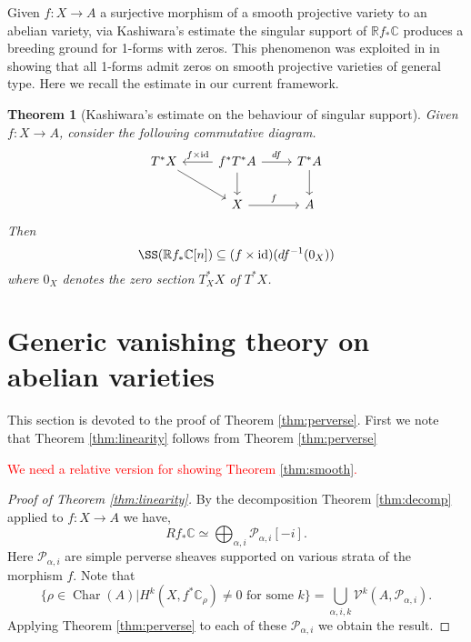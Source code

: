 \documentclass[12pt,reqno]{amsart}
\newtheorem{theorem}{Theorem}
\theoremstyle{question}
\theoremstyle{definition}
\theoremstyle{remark}
\theoremstyle{cited}
\theoremstyle{citeddef}
\DeclareMathOperator{\id}{id}                    %
\DeclareMathOperator{\Char}{Char}
\newcommand{\sP}{\mathcal{P}}
\newcommand\sV{{\mathcal V}}
\newcommand{\bbC}{\mathbb{C}}
\newcommand{\bbR}{\mathbb{R}}
\newcommand{\sorry}[1]{\textcolor{red}{#1}}
\begin{document}
Given $f\colon X\to A$ a surjective morphism of a smooth projective variety to an abelian
variety, via Kashiwara's estimate the singular support of $\bbR f_*\bbC$ produces a breeding ground for 1-forms with zeros. This phenomenon was exploited in
\cite{PS14}
in showing that all 1-forms admit zeros on smooth projective
varieties of general type. Here we recall the estimate in our
current framework. 
\begin{theorem}[Kashiwara's estimate on the behaviour of singular support]
Given $f\colon X\to A$, consider the following commutative diagram.
\[
\begin{tikzcd}
T^*X \ar[dr]& f^*T^*A \ar[d]\ar[r, "df"]\ar[l, "f\times\id"'] & T^*A\ar[d]\\
&X\ar[r, "f"] &A
\end{tikzcd}
\]
Then 
\[\SS(\bbR f_* \bbC[n]) \subseteq (f\times \id)(df^{-1}(0_X))\]
where $0_X$ denotes the zero section $T^*_XX$ of $T^*X$.

\label{thm:}
\end{theorem}












\section{Generic vanishing theory on abelian varieties}
This section is devoted to the proof of Theorem \ref{thm:perverse}. First we note that Theorem \ref{thm:linearity} follows
from Theorem \ref{thm:perverse}

\sorry{We need a relative version for showing Theorem \ref{thm:smooth}.}

\begin{proof}[Proof of Theorem \ref{thm:linearity}]
By the decomposition Theorem \ref{thm:decomp} applied to $f\colon X\to A$
we have, 
\[Rf_*\bbC\simeq \bigoplus_{\alpha,i} \sP_{\alpha,i}[-i].\]
Here $\sP_{\alpha, i}$ are simple perverse sheaves supported on various strata of the morphism $f$. 
Note that
\[\{\rho\in \Char(A)| H^k(X, f^*\bbC_{\rho})\neq 0 \text{ for some } k\} = \bigcup_{\alpha, i, k}\sV^k(A, \sP_{\alpha, i}).\]
Applying Theorem \ref{thm:perverse} to each 
of these $\sP_{\alpha,i}$ we obtain the result.
\end{proof}
\end{document}
